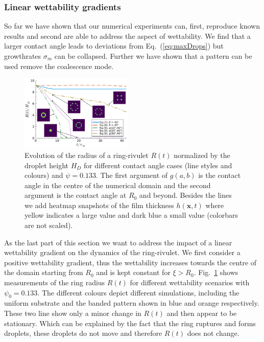 \documentclass[twoside,twocolumn,9pt]{article}
\begin{document}
\subsubsection{Linear wettability gradients}\label{subsubsec:linwettgrad}
So far we have shown that our numerical experiments can, first, reproduce known results and second are able to address the aspect of wettability.
We find that a larger contact angle leads to deviations from Eq.~(\ref{eq:maxDrops}) but growthrates $\sigma_m$ can be collapsed.
Further we have shown that a pattern can be used remove the coalescence mode.

\begin{figure}
    \centering
    \includegraphics[width=0.48\textwidth]{assets/grad_heatmap.pdf}
    \caption{Evolution of the radius of a ring-rivulet $R(t)$ normalized by the droplet height $H_D$ for different contact angle cases (line styles and colours) and $\psi = 0.133$.
    The first argument of $g(a,b)$ is the contact angle in the centre of the numerical domain and the second argument is the contact angle at $R_0$ and beyond. 
    Besides the lines we add heatmap snapshots of the film thickness $h(\mathbf{x},t)$ where yellow indicates a large value and dark blue a small value (colorbars are not scaled).}
    \label{fig:negativewetgrad}
\end{figure}
As the last part of this section we want to address the impact of a linear wettability gradient on the dynamics of the ring-rivulet. 
We first consider a positive wettability gradient, thus the wettability increases towards the centre of the domain starting from $R_0$ and is kept constant for $\xi > R_0$.
Fig.~\ref{fig:negativewetgrad} shows measurements of the ring radius $R(t)$ for different wettability scenarios with $\psi_0 = 0.133$.
The different colours depict different simulations, including the uniform substrate and the banded pattern shown in blue and orange respectively.
These two line show only a minor change in $R(t)$ and then appear to be stationary.
Which can be explained by the fact that the ring ruptures and forms droplets, these droplets do not move and therefore $R(t)$ does not change.
\end{document}

